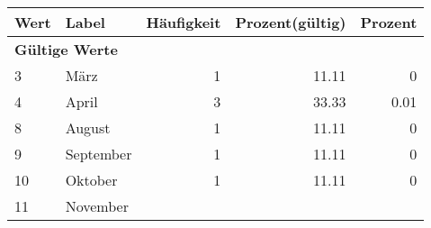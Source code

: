      \begin{longtable}{lXrrr}
     \toprule
     \textbf{Wert} & \textbf{Label} & \textbf{Häufigkeit} & \textbf{Prozent(gültig)} & \textbf{Prozent} \\
     \endhead
     \midrule
     \multicolumn{5}{l}{\textbf{Gültige Werte}}\\

     3 &
     \multicolumn{1}{X}{ März   } &


       \num{1} &
       \num[round-mode=places,round-precision=2]{11.11} &
         \num[round-mode=places,round-precision=2]{0} \\

     4 &
     \multicolumn{1}{X}{ April   } &


       \num{3} &
       \num[round-mode=places,round-precision=2]{33.33} &
         \num[round-mode=places,round-precision=2]{0.01} \\

     8 &
     \multicolumn{1}{X}{ August   } &


       \num{1} &
       \num[round-mode=places,round-precision=2]{11.11} &
         \num[round-mode=places,round-precision=2]{0} \\

     9 &
     \multicolumn{1}{X}{ September   } &


       \num{1} &
       \num[round-mode=places,round-precision=2]{11.11} &
         \num[round-mode=places,round-precision=2]{0} \\

     10 &
     \multicolumn{1}{X}{ Oktober   } &


       \num{1} &
       \num[round-mode=places,round-precision=2]{11.11} &
         \num[round-mode=places,round-precision=2]{0} \\

     11 &
     \multicolumn{1}{X}{ November   } &



\end{longtable}
